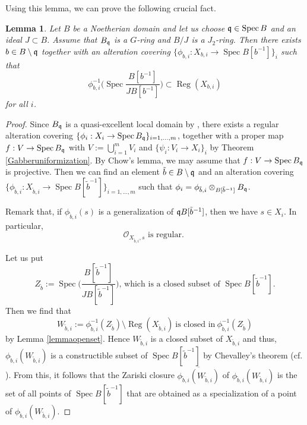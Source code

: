 \documentclass[11pt,a4paper]{amsart}
\newtheorem{lemma}[theorem]{Lemma}
\theoremstyle{definition}
\theoremstyle{remark}
\newcommand{\Spec}{\operatorname{Spec}}
\newcommand{\Reg}{\operatorname{Reg}}
\newcommand{\fq}{\frak{q}}
\begin{document}
Using this lemma, we can prove the following crucial fact.


\begin{lemma}
\label{alterationcover}
Let $B$ be a Noetherian domain and let us choose $\fq \in \Spec B$ and an ideal $J \subset B$. Assume that $B_{\fq}$ is a $G$-ring and $B/J$ is a $J_2$-ring. 
Then there exists $b \in B \setminus \fq$ together with an alteration covering $\{\phi_{b,i}:X_{b,i} \to \Spec B[b^{-1}]\}_i$ such that
\begin{equation}
\label{openset}
 \phi_{b,i}^{-1}\biggl(\Spec \frac{B[b^{-1}]}{J B[b^{-1}]}\biggl) \subset 
 \Reg(X_{b,i})
\end{equation}
for all $i$.
\end{lemma}


\begin{proof}
Since $B_{\fq}$ is a quasi-excellent local domain by \cite[Theorem 76]{Ma80}, there exists a regular alteration covering $\{ \phi_i:X_i \to \Spec B_{\fq} \}_{i = 1, \ldots, m}$, together with a proper map $f: V \to \Spec B_{\fq}$ with $V:=\bigcup_{i=1}^m V_i$ and $\{\psi_i:V_i \to X_i \}_i$ by Theorem \ref{Gabberuniformization}. 
By Chow's lemma, we may assume that $f:V \to \Spec B_{\fq}$ is projective. 
Then we can find an element $\tilde{b} \in B \setminus \fq$ and an alteration covering $\{\phi_{\tilde{b},i}:X_{\tilde{b},i} \to \Spec B[\tilde{b}^{-1}]\}_{i = 1, \ldots, m}$ such that $\phi_i=\phi_{\tilde{b},i} \otimes_{B[\tilde{b}^{-1}]} B_{\fq}$. 

Remark that, if $\phi_{\tilde{b},i}(s)$ is a generalization of $\fq B[\tilde{b}^{-1}]$, then we have $s \in X_i$. In particular, 
\begin{equation}\label{reg}
\mbox{$\mathcal{O}_{X_{\tilde{b},i},s}$ is regular. }
\end{equation}

Let us put
$$
\mbox{$Z_{\tilde{b}}:=\Spec \biggl(\dfrac{B[\tilde{b}^{-1}]}{J B[\tilde{b}^{-1}]}\biggl)$, which is a closed subset of $\Spec B[\tilde{b}^{-1}]$.}
$$
Then we find that
$$ 
W_{\tilde{b},i}:=\phi^{-1}_{\tilde{b},i}(Z_{\tilde{b}}) \setminus \Reg(X_{\tilde{b},i})~\mbox{is closed in}~\phi^{-1}_{\tilde{b},i}(Z_{\tilde{b}})
$$
by Lemma \ref{lemmaopenset}. Hence $W_{\tilde{b},i}$ is a closed subset of $X_{\tilde{b},i}$ and thus, $\phi_{\tilde{b},i}(W_{\tilde{b},i})$ is a constructible subset of $\Spec B[\tilde{b}^{-1}]$ by Chevalley's theorem (cf. \cite[Theorem 6]{Ma80}). 
From this, it follows that the Zariski closure $\overline{\phi_{\tilde{b},i}(W_{\tilde{b},i})}$ of $\phi_{\tilde{b},i}(W_{\tilde{b},i})$ is the set of all points of $\Spec B[\tilde{b}^{-1}]$ that are obtained as a specialization of a point of $\phi_{\tilde{b},i}(W_{\tilde{b},i})$.


\end{proof}
\end{document}
